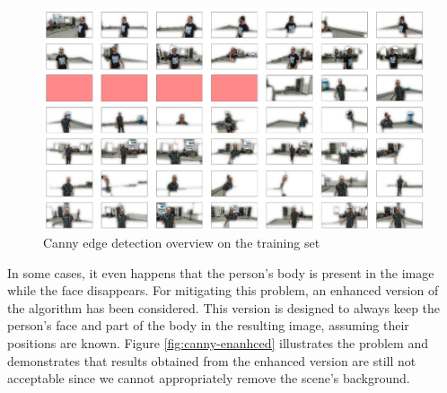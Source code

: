 \begin{figure}[!htb]
	\centering
	\includegraphics[width=1\textwidth]{"contents/images/04-1canny-overview"}
	\caption[Canny edge detection overview on the training set]{Canny edge detection overview on the training set}
	\label{fig:canny-overview}
\end{figure}

In some cases, it even happens that the person's body is present in the image while the face disappears. For mitigating this problem, an enhanced version of the algorithm has been considered. This version is designed to always keep the person's face and part of the body in the resulting image, assuming their positions are known. Figure \ref{fig:canny-enanhced} illustrates the problem and demonstrates that results obtained from the enhanced version are still not acceptable since we cannot appropriately remove the scene's background.

